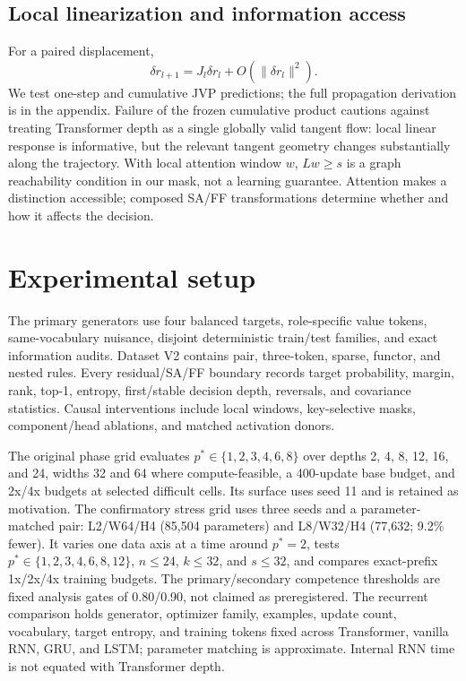 \documentclass[10pt]{article}
\begin{document}
\subsection{Local linearization and information access}
For a paired displacement,
\begin{equation}\delta r_{l+1}=J_l\delta r_l+O(\|\delta r_l\|^2).\end{equation}
We test one-step and cumulative JVP predictions; the full propagation derivation is in the appendix. Failure of the frozen cumulative product cautions against treating Transformer depth as a single globally valid tangent flow: local linear response is informative, but the relevant tangent geometry changes substantially along the trajectory. With local attention window $w$, $Lw\ge s$ is a graph reachability condition in our mask, not a learning guarantee. Attention makes a distinction accessible; composed SA/FF transformations determine whether and how it affects the decision.

\section{Experimental setup}
The primary generators use four balanced targets, role-specific value tokens, same-vocabulary nuisance, disjoint deterministic train/test families, and exact information audits. Dataset V2 contains pair, three-token, sparse, functor, and nested rules. Every residual/SA/FF boundary records target probability, margin, rank, top-1, entropy, first/stable decision depth, reversals, and covariance statistics. Causal interventions include local windows, key-selective masks, component/head ablations, and matched activation donors.

The original phase grid evaluates $p^*\in\{1,2,3,4,6,8\}$ over depths 2, 4, 8, 12, 16, and 24, widths 32 and 64 where compute-feasible, a 400-update base budget, and 2x/4x budgets at selected difficult cells. Its surface uses seed 11 and is retained as motivation. The confirmatory stress grid uses three seeds and a parameter-matched pair: L2/W64/H4 (85,504 parameters) and L8/W32/H4 (77,632; 9.2\% fewer). It varies one data axis at a time around $p^*=2$, tests $p^*\in\{1,2,3,4,6,8,12\}$, $n\le24$, $k\le32$, and $s\le32$, and compares exact-prefix 1x/2x/4x training budgets. The primary/secondary competence thresholds are fixed analysis gates of 0.80/0.90, not claimed as preregistered. The recurrent comparison holds generator, optimizer family, examples, update count, vocabulary, target entropy, and training tokens fixed across Transformer, vanilla RNN, GRU, and LSTM; parameter matching is approximate. Internal RNN time is not equated with Transformer depth.
\end{document}
